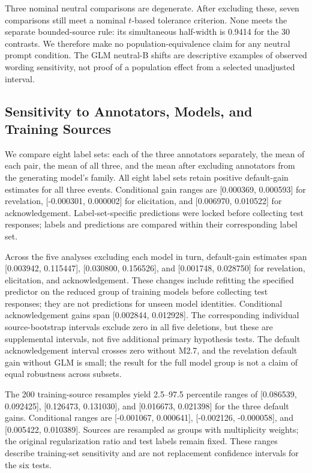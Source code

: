 Three nominal neutral comparisons are degenerate. After excluding these,
seven comparisons still meet a nominal $t$-based tolerance criterion. None
meets the separate bounded-source rule: its simultaneous half-width is
0.9414 for the 30 contrasts. We therefore make no population-equivalence
claim for any neutral prompt condition. The GLM neutral-B shifts are descriptive examples
of observed wording sensitivity, not proof of a population effect from a
selected unadjusted interval.

\subsection{Sensitivity to Annotators, Models, and Training Sources}

We compare eight label sets: each of the three annotators separately, the
mean of each pair, the mean of all three, and the mean after excluding
annotators from the generating model's family.
All eight label sets retain positive default-gain estimates for all three events.
Conditional gain ranges are [0.000369, 0.000593] for revelation,
[-0.000301, 0.000002] for elicitation, and [0.006970, 0.010522] for
acknowledgement. Label-set-specific predictions were locked before collecting test responses;
labels and predictions are compared within their corresponding label set.

Across the five analyses excluding each model in turn, default-gain estimates span
[0.003942, 0.115447], [0.030800, 0.156526], and [0.001748, 0.028750] for
revelation, elicitation, and acknowledgement. These changes include refitting
the specified predictor on the reduced group of training models before collecting test responses;
they are not predictions for unseen model identities. Conditional
acknowledgement gains span [0.002844, 0.012928]. The corresponding individual
source-bootstrap intervals exclude zero in all five deletions, but these
are supplemental intervals, not five additional primary hypothesis tests.
The default acknowledgement interval crosses zero without M2.7, and the
revelation default gain without GLM is small; the result for the full model group is not
a claim of equal robustness across subsets.

The 200 training-source resamples yield 2.5--97.5 percentile ranges of
[0.086539, 0.092425], [0.126473, 0.131030], and [0.016673, 0.021398] for
the three default gains. Conditional ranges are [-0.001067, 0.000641],
[-0.002126, -0.000058], and [0.005422, 0.010389]. Sources are resampled
as groups with multiplicity weights; the original regularization ratio and
test labels remain fixed. These ranges describe training-set
sensitivity and are not replacement confidence intervals for the six tests.

